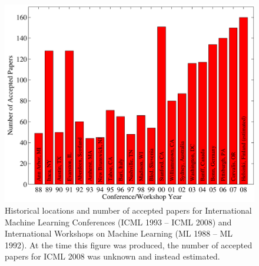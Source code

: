\begin{figure}[ht]
\vskip 0.2in
\begin{center}
\centerline{\includegraphics[width=\columnwidth]{icml_numpapers}}
\caption{Historical locations and number of accepted papers for International
Machine Learning Conferences (ICML 1993 -- ICML 2008) and International
Workshops on Machine Learning (ML 1988 -- ML 1992). At the time this figure was
produced, the number of accepted papers for ICML 2008 was unknown and instead
estimated.}
\label{icml-historical}
\end{center}
\vskip -0.2in
\end{figure}
\fi